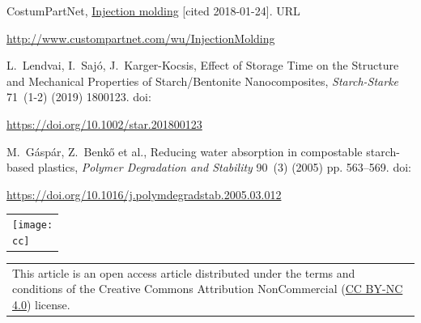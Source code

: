 \documentclass[10pt,a4paper,twocolumns]{article}
\begin{document}
\begin{thebibliography}{1}
CostumPartNet,
  \href{http://www.custompartnet.com/wu/InjectionMolding}{Injection molding}
  [cited 2018-01-24].
\newline URL \begin{footnotesize}\url{http://www.custompartnet.com/wu/InjectionMolding}\end{footnotesize}

L.~Lendvai, I.~Sajó, J.~Karger-Kocsis, Effect of Storage Time on the Structure and Mechanical Properties of Starch/Bentonite Nanocomposites,  \textit{Starch-Starke} 71~(1-2) (2019) 1800123.
\newline doi: \begin{footnotesize}\url{https://doi.org/10.1002/star.201800123}\end{footnotesize}
	
M.~Gáspár, Z.~Benkő et al., Reducing water absorption in compostable starch-based plastics, 
 \textit{Polymer Degradation and Stability} 90~(3) (2005) pp. 563--569.
\newline doi: \begin{footnotesize}\url{https://doi.org/10.1016/j.polymdegradstab.2005.03.012}\end{footnotesize}

\end{thebibliography}


\begin{table}[H]

\begin{minipage}{.15\textwidth}
    \begin{tabular}{*{1}{p{}}}
\texttt{[image: \\cc]}
\\
\end{tabular}
\end{minipage}%
\begin{minipage}{.5\textwidth}
    \begin{tabular}{*{1}{p{}}}
\footnotesize 
This article is an open access article distributed under the terms and conditions of the Creative Commons Attribution NonCommercial (\href{https://creativecommons.org/licenses/by-nc/4.0/}{CC BY-NC 4.0}) license. \\
\end{tabular}
\end{minipage}%
\end{table}
\end{document}

